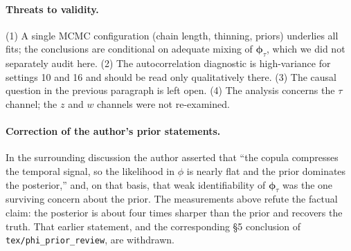 \documentclass[11pt]{article}
\theoremstyle{definition}
\newcommand{\phitau}{\bm{\phi}_\tau}
\newcommand{\code}[1]{\texttt{#1}}
\begin{document}
\paragraph{Threats to validity.} (1) A single MCMC configuration (chain length,
thinning, priors) underlies all fits; the conclusions are conditional on adequate
mixing of $\phitau$, which we did not separately audit here. (2) The autocorrelation
diagnostic is high-variance for settings 10 and 16 and should be read only
qualitatively there. (3) The causal question in the previous paragraph is left
open. (4) The analysis concerns the $\tau$ channel; the $z$ and $w$ channels were
not re-examined.

\paragraph{Correction of the author's prior statements.} In the surrounding
discussion the author asserted that ``the copula compresses the temporal signal,
so the likelihood in $\phi$ is nearly flat and the prior dominates the
posterior,'' and, on that basis, that weak identifiability of $\phitau$ was the
one surviving concern about the prior. The measurements above refute the factual
claim: the posterior is about four times sharper than the prior and recovers the
truth. That earlier statement, and the corresponding \S5 conclusion of
\code{tex/phi\_prior\_review}, are withdrawn.
\end{document}
